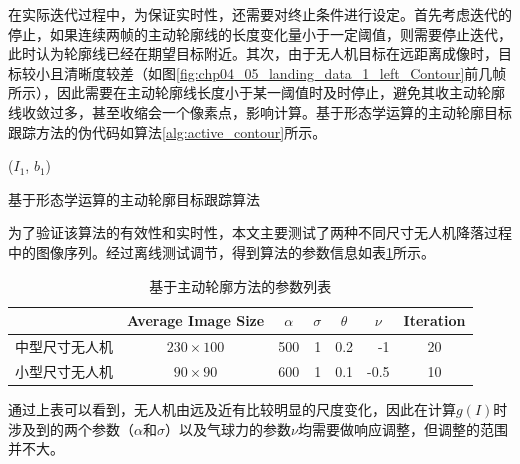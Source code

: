 在实际迭代过程中，为保证实时性，还需要对终止条件进行设定。首先考虑迭代的停止，如果连续两帧的主动轮廓线的长度变化量小于一定阈值，则需要停止迭代，此时认为轮廓线已经在期望目标附近。其次，由于无人机目标在远距离成像时，目标较小且清晰度较差（如图\ref{fig:chp04_05_landing_data_1_left_Contour}前几帧所示），因此需要在主动轮廓线长度小于某一阈值时及时停止，避免其收主动轮廓线收敛过多，甚至收缩会一个像素点，影响计算。基于形态学运算的主动轮廓目标跟踪方法的伪代码如算法\ref{alg:active_contour}所示。
\begin{algorithm2e}[ht]
	\SetAlgoLined
	\BlankLine
	\Initialization($I_1$, $b_1$)\;	
	\caption{基于形态学运算的主动轮廓目标跟踪算法}
	\label{alg:active_contour}
\end{algorithm2e}


为了验证该算法的有效性和实时性，本文主要测试了两种不同尺寸无人机降落过程中的图像序列。经过离线测试调节，得到算法的参数信息如表\ref{lab:active_contours_params}所示。
\begin{table}[ht]
	\centering
	\caption{基于主动轮廓方法的参数列表}
	\label{lab:active_contours_params}
	\begin{tabular}{ccrrrrc}
		\hline
		\multicolumn{1}{l}{} & Average Image Size & \multicolumn{1}{c}{$\alpha$} & \multicolumn{1}{c}{$\sigma$} & \multicolumn{1}{c}{$\theta$} & \multicolumn{1}{c}{$\nu$} & Iteration \\ \hline
		中型尺寸无人机              & $230 \times 100$   & 500                          & 1                            & 0.2                          & -1                        & 20        \\
		小型尺寸无人机              & $90 \times 90$     & 600                          & 1                            & 0.1                          & -0.5                      & 10        \\ \hline
	\end{tabular}
\end{table}
通过上表可以看到，无人机由远及近有比较明显的尺度变化，因此在计算$g(I)$时涉及到的两个参数（$\alpha$和$\sigma$）以及气球力的参数$\nu$均需要做响应调整，但调整的范围并不大。

